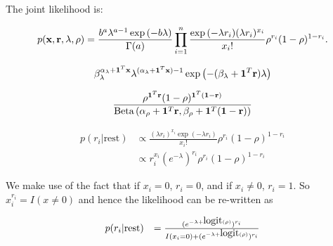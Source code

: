 \documentclass{amsart}
\begin{document}
The joint likelihood is:

$$
p({\bf x}, {\bf r}, \lambda, \rho) = \frac{b^a \lambda^{a - 1} \exp{(-b \lambda)}}{\Gamma{(a)}} \prod_{i=1}^n \frac{\exp{(-\lambda r_i)} (\lambda r_i)^{x_i}}{x_i !} \rho^{r_i} (1 - \rho)^{1 - r_i}.
$$

%
%
%


$$
\beta_{\lambda}^{\alpha_\lambda+{\bf 1}^T{\bf x}} \lambda^{(\alpha_\lambda + {\bf 1}^T{\bf x}) - 1} \exp{\left(-(\beta_\lambda + {\bf1}^T{\bf r}) \lambda \right)}
$$

$$
\frac{\rho^{{\bf 1}^T{\bf r}} (1 - \rho)^{{\bf 1}^T({\bf 1} - {\bf r})}}{{\text{Beta} \left( \alpha_\rho + {\bf 1}^T {\bf r}, \beta_\rho + {\bf 1}^T({\bf 1} - {\bf r}) \right)}}
$$

$$
\begin{array}{ll}
p(r_i | \text{rest}) &\propto \frac{(\lambda r_i)^{x_i} \exp{(-\lambda r_i)}}{x_i !} \rho^{r_i} (1 - \rho)^{1 - r_i} \\
&\propto r_i^{x_i} (e^{-\lambda})^{r_i} \rho^{r_i} (1 - \rho)^{1 - r_i}
\end{array}
$$

We make use of the fact that if $x_i = 0$, $r_i = 0$, and if $x_i \ne 0$,
$r_i = 1$. So $x_i^{r_i} = I(x \ne 0)$ and hence the likelihood can be re-written as

$$
\begin{array}{ll}
p(r_i | \text{rest}) &= \frac{(e^{-\lambda + \mbox{logit}{(\rho)}})^{r_i}}{I(x_i = 0) + (e^{-\lambda + \mbox{logit}{(\rho)}})^{r_i}}
\end{array}
$$


\end{document}
